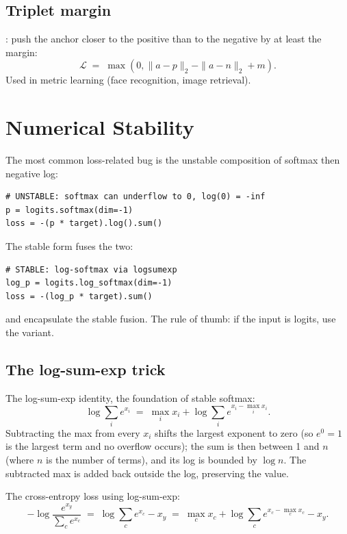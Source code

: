 \subsection{Triplet margin}
\label{ssec:losses:triplet}

:
push the anchor closer to the positive than to the negative by at
least the margin:
\[
\mathcal{L} \;=\; \max(0, \|a - p\|_2 - \|a - n\|_2 + m).
\]
Used in metric learning (face recognition, image retrieval).

\section{Numerical Stability}
\label{sec:losses:numerical_stability}

The most common loss-related bug is the unstable composition of
softmax then negative log:
\begin{lstlisting}[style=lucid,language=LucidPython]
# UNSTABLE: softmax can underflow to 0, log(0) = -inf
p = logits.softmax(dim=-1)
loss = -(p * target).log().sum()
\end{lstlisting}

The stable form fuses the two:
\begin{lstlisting}[style=lucid,language=LucidPython]
# STABLE: log-softmax via logsumexp
log_p = logits.log_softmax(dim=-1)
loss = -(log_p * target).sum()
\end{lstlisting}

 and  encapsulate
the stable fusion. The rule of thumb: if the input is logits,
use the  variant.

\subsection{The log-sum-exp trick}
\label{ssec:losses:logsumexp}

The log-sum-exp identity, the foundation of stable softmax:
\[
  \log \sum_i e^{x_i} \;=\; \max_i x_i + \log \sum_i e^{x_i - \max_i x_i}.
\]
Subtracting the max from every $x_i$ shifts the largest
exponent to zero (so $e^0 = 1$ is the largest term and no
overflow occurs); the sum is then between 1 and $n$ (where $n$
is the number of terms), and its log is bounded by $\log n$.
The subtracted max is added back outside the log, preserving
the value.

The cross-entropy loss using log-sum-exp:
\[
  -\log \frac{e^{x_y}}{\sum_c e^{x_c}}
  \;=\;
  \log \sum_c e^{x_c} - x_y
  \;=\;
  \max_c x_c + \log \sum_c e^{x_c - \max_c x_c} - x_y.
\]


